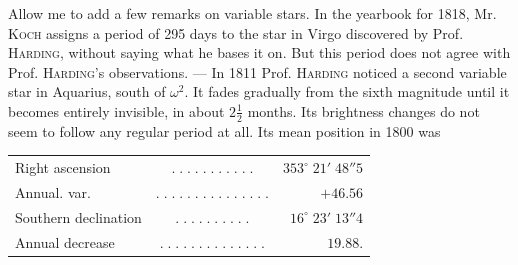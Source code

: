\par\indent Allow me to add a few remarks on variable stars. In the yearbook for 1818, Mr. \textsc{Koch} assigns a period of 295 days to the star in Virgo discovered by Prof. \textsc{Harding}, without saying what he bases it on. But this period does not agree with Prof. \textsc{Harding}’s observations. — In 1811 Prof. \textsc{Harding} noticed a second variable star in Aquarius, south of $\omega^2$. It fades gradually from the sixth magnitude until it becomes entirely invisible, in about $2\frac12$ months. Its brightness changes do not seem to follow any regular period at all. Its mean position in 1800 was
\begin{center}\fontsize{10}{12}\selectfont\setlength{\tabcolsep}{3pt}\begin{tabular}{lcr}
Right ascension & $.\;.\;.\;.\;.\;.\;.\;.\;.\;.\;.$ & $353^\circ\;21'\;48''5$\\
Annual. var. & $.\;.\;.\;.\;.\;.\;.\;.\;.\;.\;.\;.\;.\;.\;.$ & $+46.56$\\
Southern declination & $.\;.\;.\;.\;.\;.\;.\;.\;.\;.$ & $16^\circ\;23'\;13''4$\\
Annual decrease & $.\;.\;.\;.\;.\;.\;.\;.\;.\;.\;.\;.\;.\;.$ & $19.88$.\\
\end{tabular}\end{center}
